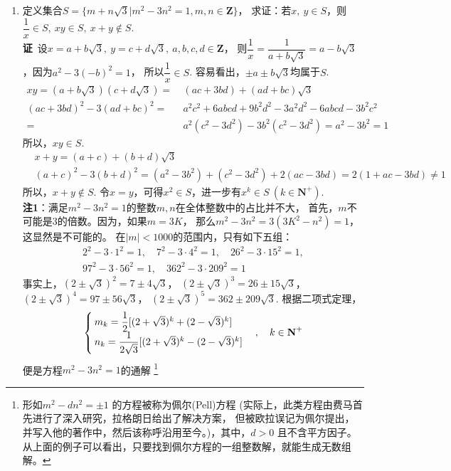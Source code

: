 \begin{enumerate}[label={【\textbf{例\thechapter.\arabic*}】},
 leftmargin=\inteval{\myenumleftmargin}pt,
 itemsep=\inteval{\myenumitempsep}pt,
 itemindent=\inteval{\myenumitemindent}pt]
\item\label{m+nsqrt3} 定义集合$ S=\{m+n\sqrt{3}|m^2-3n^2=1,m,n\in \textbf{Z}\} $，
求证：若$ x,\ y\in S $，则$ \dfrac{1}{x}\in S,\ xy \in　S,\ x+y\notin S $. \\
\textbf{证}\ 设$ x=a+b\sqrt{3},\ y=c+d\sqrt{3},\ a,b,c,d\in \textbf{Z} $，
则$ \dfrac{1}{x}=\dfrac{1}{a+b\sqrt{3}}=a-b\sqrt{3} $，因为$ a^2-3(-b)^2=1 $，
所以$ \dfrac{1}{x}\in S $. 容易看出，$ \pm a \pm b\sqrt{3} $均属于$ S $. 
\begin{align*}
    xy=(a+b\sqrt{3})(c+d\sqrt{3})=&\  (ac+3bd)+(ad+bc)\sqrt{3} \\
    (ac+3bd)^2-3(ad+bc)^2 =&\  a^2c^2+6abcd+9b^2d^2-3a^2d^2-6abcd-3b^2c^2 \\
    =&\  a^2(c^2-3d^2)-3b^2(c^2-3d^2)=a^2-3b^2=1 
\end{align*}
所以，$ xy\in S $.
\begin{align*}
    & x+y=(a+c)+(b+d)\sqrt{3} \\
    & (a+c)^2-3(b+d)^2=(a^2-3b^2)+(c^2-3d^2)+2(ac-3bd)=2(1+ac-3bd)\neq 1
\end{align*}
所以，$ x+y\notin S $. 令$ x=y $，可得$ x^2\in S $，进一步有$ x^k\in S\ 
(k\in \textbf{N}^+) $. \\
\textbf{注1}：满足$ m^2-3n^2=1 $的整数$ m,n $在全体整数中的占比并不大，
首先，$ m $不可能是3的倍数。因为，如果$ m=3K $，
那么$ m^2-3n^2=3(3K^2-n^2)=1 $，这显然是不可能的。
在$ |m|<1000 $的范围内，只有如下五组：
\begin{gather*}
   2^2-3\cdot 1^2=1,\quad 7^2-3\cdot 4^2=1,\quad 26^2-3\cdot 15^2=1,\\
    97^2-3\cdot 56^2=1,\quad 362^2-3\cdot 209^2=1
\end{gather*}
事实上，$ (2\pm\sqrt{3})^2=7\pm 4\sqrt{3} $，
$ (2\pm\sqrt{3})^3=26\pm 15\sqrt{3} $，
$ (2\pm\sqrt{3})^4=97\pm 56\sqrt{3} $，
$ (2\pm \sqrt{3})^5=362\pm 209\sqrt{3} $. 
根据二项式定理，
\begin{gather*}
    \begin{cases}
        m_k =\dfrac{1}{2}[(2+\sqrt{3})^k+(2-\sqrt{3})^k] \\ 
        n_k =\dfrac{1}{2\sqrt{3}}[(2+\sqrt{3})^k-(2-\sqrt{3})^k]    
    \end{cases} , \quad  k\in \textbf{N}^+
\end{gather*}
便是方程$ m^2-3n^2=1 $的通解
\footnote{形如$ m^2-dn^2=\pm 1 $ 的方程被称为佩尔(Pell)方程
(实际上，此类方程由费马首先进行了深入研究，拉格朗日给出了解决方案，
但被欧拉误记为佩尔提出，并写入他的著作中，然后该称呼沿用至今。)，其中，$ d>0 $
且不含平方因子。从上面的例子可以看出，只要找到佩尔方程的一组整数解，就能生成无数组解。
}
\end{enumerate}
